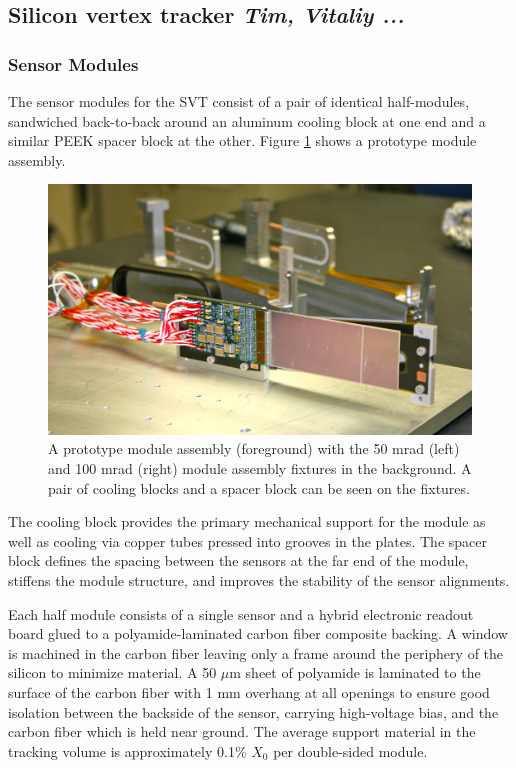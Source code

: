 \subsection{Silicon vertex tracker {\it Tim, Vitaliy ...}}
\label{sec:svtŧ}


\subsubsection{Sensor Modules}

The sensor modules for the SVT consist of a pair of identical half-modules, sandwiched back-to-back around an aluminum cooling block at one end and a similar PEEK spacer block at the other. Figure \ref{fig:tracker_module} shows a prototype module assembly.
\begin{figure}[ht]
    \includegraphics[width=\textwidth]{svt/IMG_5200}
\caption{\small{A prototype module assembly (foreground) with the 50 mrad (left) and 100 mrad (right) module assembly fixtures in the background.  A pair of cooling blocks and a spacer block can be seen on the fixtures.} }
\label{fig:tracker_module}
\end{figure}
The cooling block provides the primary mechanical support for the module as well as cooling via copper tubes pressed into grooves in the plates. The spacer block defines the spacing between the sensors at the far end of the module, stiffens the module structure, and improves the stability of the sensor alignments.  

Each half module consists of a single sensor and a hybrid electronic readout board glued to a polyamide-laminated carbon fiber composite backing.  A window is machined in the carbon fiber leaving only a frame around the periphery of the silicon to minimize material. A 50 $\mu$m sheet of polyamide is laminated to the surface of the carbon fiber with 1 mm overhang at all openings to ensure good isolation between the backside of the sensor, carrying high-voltage bias, and the carbon fiber which is held near ground.  The average support material in the tracking volume is approximately 0.1\% $X_{0}$ per double-sided module.

